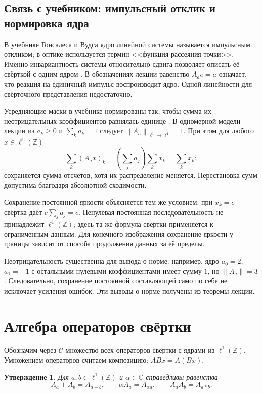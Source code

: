 \documentclass[12pt,a4paper]{article}
\newtheorem{proposition}{Утверждение}
\theoremstyle{definition}
\theoremstyle{remark}
\newcommand{\CC}{\mathbb{C}}
\newcommand{\ZZ}{\mathbb{Z}}
\newcommand{\norm}[1]{\left\lVert #1\right\rVert}
\newcommand{\Conv}{\mathcal C}
\begin{document}
\subsection{Связь с учебником: импульсный отклик и нормировка ядра}

В учебнике Гонсалеса и Вудса ядро линейной системы называется
импульсным откликом; в оптике используется термин <<функция рассеяния
точки>>. Именно инвариантность системы относительно сдвига позволяет
описать её свёрткой с одним ядром
\cite[\S\,5.5, с.~405]{GW2012}.
В обозначениях лекции равенство $A_ae=a$ означает, что реакция
на единичный импульс воспроизводит ядро. Одной линейности
для свёрточного представления недостаточно.

Усредняющие маски в учебнике нормированы так, чтобы сумма их
неотрицательных коэффициентов равнялась единице
\cite[\S\,3.5.1, с.~195]{GW2012}.
В одномерной модели лекции из $a_k\geqslant0$ и $\sum_k a_k=1$
следует $\norm{A_a}_{\ell^1\to\ell^1}=1$.
При этом для любого $x\in\ell^1(\ZZ)$
\[
  \sum_k(A_ax)_k=\left(\sum_j a_j\right)\sum_k x_k=\sum_k x_k:
\]
сохраняется сумма отсчётов, хотя их распределение меняется.
Перестановка сумм допустима благодаря абсолютной сходимости.

Сохранение постоянной яркости объясняется тем же условием:
при $x_k=c$ свёртка даёт $c\sum_j a_j=c$.
Ненулевая постоянная последовательность не принадлежит $\ell^1(\ZZ)$;
здесь та же формула свёртки применяется к ограниченным данным.
Для конечного изображения сохранение яркости у границы зависит
от способа продолжения данных за её пределы.

Неотрицательность существенна для вывода о норме: например,
ядро $a_0=2$, $a_1=-1$ с остальными нулевыми коэффициентами
имеет сумму $1$, но $\norm{A_a}=3$. Следовательно, сохранение
постоянной составляющей само по себе не исключает усиления ошибок.
Эти выводы о норме получены из теоремы лекции.

\section{Алгебра операторов свёртки}

Обозначим через $\Conv$ множество всех операторов свёртки с ядрами
из $\ell^1(\ZZ)$. Умножением операторов считаем композицию:
$ABx=A(Bx)$.

\begin{proposition}
Для $a,b\in\ell^1(\ZZ)$ и $\alpha\in\CC$ справедливы равенства
\[
  A_a+A_b=A_{a+b},\qquad
  \alpha A_a=A_{\alpha a},\qquad
  A_aA_b=A_{a*b}.
\]
\end{proposition}
\end{document}
